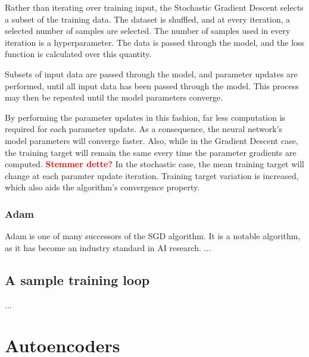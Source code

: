 Rather than iterating over training input, the Stochastic Gradient Descent selects a subset of the training data.
The dataset is shuffled, and at every iteration, a selected number of samples are selected. 
The number of samples used in every iteration is a hyperparameter.
The data is passed through the model, and the loss function is calculated over this quantity.

Subsets of input data are passed through the model, and parameter updates are performed, until all input data has been passed through the model.
This process may then be repeated until the model parameters converge.

By performing the parameter updates in this fashion, far less computation is required for each parameter update.
As a consequence, the neural network's model parameters will converge faster. 
Also, while in the Gradient Descent case, the training target will remain the same every time the parameter gradients are computed.
\textcolor{red}{\textbf{Stemmer dette?}} In the stochastic case, the mean training target will change at each paramter update iteration. 
Training target variation is increased, which also aids the algorithm's convergence property.


\subsubsection{Adam}

Adam is one of many successors of the SGD algorithm. 
It is a notable algorithm, as it has become an industry standard in AI research.
...









\subsection{A sample training loop}
...












\section{Autoencoders}

